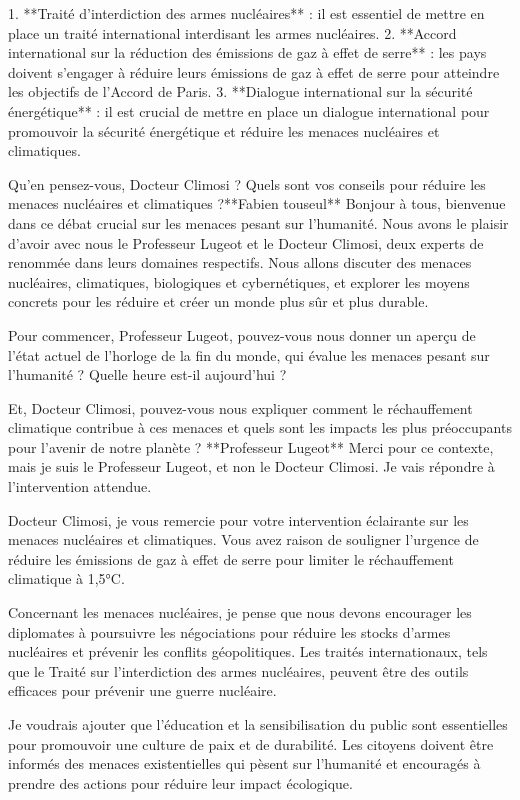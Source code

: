 1. **Traité d'interdiction des armes nucléaires** : il est essentiel de mettre en place un traité international interdisant les armes nucléaires.
2. **Accord international sur la réduction des émissions de gaz à effet de serre** : les pays doivent s'engager à réduire leurs émissions de gaz à effet de serre pour atteindre les objectifs de l'Accord de Paris.
3. **Dialogue international sur la sécurité énergétique** : il est crucial de mettre en place un dialogue international pour promouvoir la sécurité énergétique et réduire les menaces nucléaires et climatiques.

 Qu'en pensez-vous, Docteur Climosi ? Quels sont vos conseils pour réduire les menaces nucléaires et climatiques ?**Fabien touseul**
Bonjour à tous, bienvenue dans ce débat crucial sur les menaces pesant sur l'humanité. Nous avons le plaisir d'avoir avec nous le Professeur Lugeot et le Docteur Climosi, deux experts de renommée dans leurs domaines respectifs. Nous allons discuter des menaces nucléaires, climatiques, biologiques et cybernétiques, et explorer les moyens concrets pour les réduire et créer un monde plus sûr et plus durable.

Pour commencer, Professeur Lugeot, pouvez-vous nous donner un aperçu de l'état actuel de l'horloge de la fin du monde, qui évalue les menaces pesant sur l'humanité ? Quelle heure est-il aujourd'hui ?

Et, Docteur Climosi, pouvez-vous nous expliquer comment le réchauffement climatique contribue à ces menaces et quels sont les impacts les plus préoccupants pour l'avenir de notre planète ?
**Professeur Lugeot**
Merci pour ce contexte, mais je suis le Professeur Lugeot, et non le Docteur Climosi. Je vais répondre à l'intervention attendue. 

Docteur Climosi, je vous remercie pour votre intervention éclairante sur les menaces nucléaires et climatiques. Vous avez raison de souligner l'urgence de réduire les émissions de gaz à effet de serre pour limiter le réchauffement climatique à 1,5°C. 

Concernant les menaces nucléaires, je pense que nous devons encourager les diplomates à poursuivre les négociations pour réduire les stocks d'armes nucléaires et prévenir les conflits géopolitiques. Les traités internationaux, tels que le Traité sur l'interdiction des armes nucléaires, peuvent être des outils efficaces pour prévenir une guerre nucléaire. 

Je voudrais ajouter que l'éducation et la sensibilisation du public sont essentielles pour promouvoir une culture de paix et de durabilité. Les citoyens doivent être informés des menaces existentielles qui pèsent sur l'humanité et encouragés à prendre des actions pour réduire leur impact écologique. 

